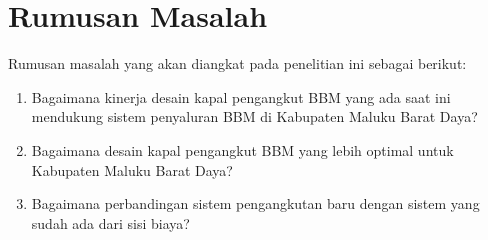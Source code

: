 \section{Rumusan Masalah}
\label{sec:rumusan masalah}

Rumusan masalah yang akan diangkat pada penelitian ini sebagai berikut:
\begin{enumerate}
    \item Bagaimana kinerja desain kapal pengangkut BBM yang ada saat ini mendukung sistem penyaluran BBM di Kabupaten Maluku Barat Daya?
    \item Bagaimana desain kapal pengangkut BBM yang lebih optimal untuk Kabupaten Maluku Barat Daya?
    \item Bagaimana perbandingan sistem pengangkutan baru dengan sistem yang sudah ada dari sisi biaya?
\end{enumerate}
